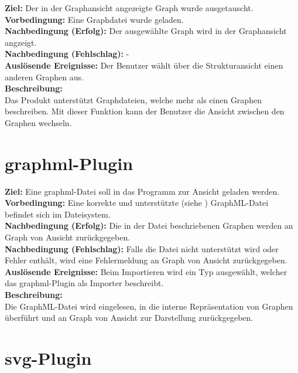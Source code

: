 \label{fa:graphwechsel}
\textbf{Ziel:} Der in der Graphansicht angezeigte Graph wurde ausgetauscht. \\
\textbf{Vorbedingung:} Eine Graphdatei wurde geladen.\\
\textbf{Nachbedingung (Erfolg):} Der ausgewählte Graph wird in der Graphansicht angzeigt.\\
\textbf{Nachbedingung (Fehlschlag):} -\\
\textbf{Auslösende Ereignisse:}
Der Benutzer wählt über die Strukturansicht einen anderen Graphen aus.\\
\textbf{Beschreibung:}\\
Das Produkt unterstützt Graphdateien, welche mehr als einen Graphen beschreiben.
Mit dieser Funktion kann der Benutzer die Ansicht zwischen den Graphen wechseln.


\label{fa:speichern}
\label{fa:laden}
\label{fa:laden}

\section{\gls{graphml}-Plugin}
\setcounter{fanr}{300}

\label{fa:importgraphml}
\textbf{Ziel:} Eine \gls{graphml}-Datei soll in das Programm zur Ansicht geladen werden.\\
\textbf{Vorbedingung:} Eine korrekte und unterstützte (siehe ) GraphML-Datei befindet sich im Dateisystem.\\
\textbf{Nachbedingung (Erfolg):} Die in der Datei beschriebenen Graphen werden an Graph von Ansicht zurückgegeben.\\
\textbf{Nachbedingung (Fehlschlag):} Falls die Datei nicht unterstützt wird oder Fehler enthält, wird eine Fehlermeldung an Graph von Ansicht zurückgegeben.\\
\textbf{Auslösende Ereignisse:} Beim Importieren wird ein Typ ausgewählt, welcher das \gls{graphml}-Plugin als Importer beschreibt.\\
\textbf{Beschreibung:}\\
Die GraphML-Datei wird eingelesen, in die interne Repräsentation von Graphen überführt und an Graph von Ansicht zur Darstellung zurückgegeben.

\section{\gls{svg}-Plugin}
\setcounter{fanr}{400}

